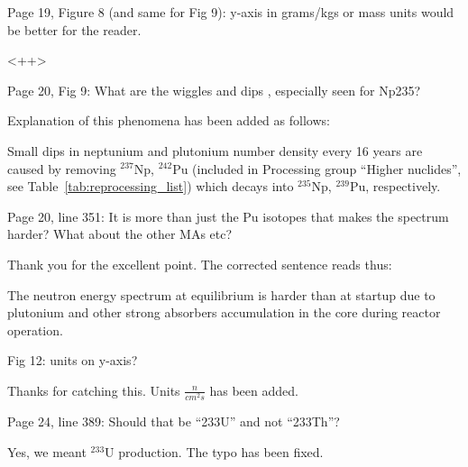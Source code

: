 \documentclass[answers,11pt]{exam}
\begin{document}
\begin{questions}
        \question  Page 19, Figure 8 (and same for Fig 9): y-axis in grams/kgs 
        or mass units would be better for the reader.
        \begin{solution}
                <++>
        \end{solution}

        \question  Page 20, Fig 9: What are the wiggles and dips , especially 
        seen for Np235?
        \begin{solution}
		        Explanation of this phenomena has been added as follows:
        
		         Small dips in neptunium and plutonium number density every 16 years are 
		         caused by removing $^{237}$Np, $^{242}$Pu (included in Processing group 
		         ``Higher nuclides'', see Table~\ref{tab:reprocessing_list}) which decays
        		  into $^{235}$Np, $^{239}$Pu, respectively. 
        \end{solution}

        \question  Page 20, line 351: It is more than just the Pu isotopes that 
        makes the spectrum harder? What about the other MAs etc?
        \begin{solution}
        		Thank you for the excellent point. The corrected sentence reads thus: 
        
		        The neutron energy spectrum at equilibrium is harder than at startup due
		         to plutonium and other strong absorbers accumulation in the core during 
		         reactor operation.  
        \end{solution}

        \question  Fig 12: units on y-axis?
        \begin{solution}
                Thanks for catching this. Units $\frac{n}{cm^2 s}$ has been added.
        \end{solution}

        \question  Page 24, line 389: Should that be ``233U'' and not ``233Th''?
        \begin{solution}
                Yes, we meant $^{233}$U production. The typo has been fixed.
        \end{solution}


\end{questions}
\end{document}
